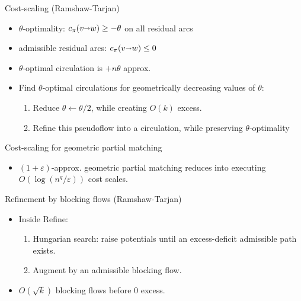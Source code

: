 \documentclass[xcolor={dvipsnames,usenames}]{beamer}
\newcommand{\eps}{\varepsilon}
\def\arcto{\mathord\shortrightarrow}
\def\arc#1#2{#1\arcto#2}
\begin{document}
\begin{frame}{Cost-scaling (Ramshaw-Tarjan)}
\begin{itemize}
\item \alert{$\theta$-optimality}: $c_\pi(\arc vw) \geq -\theta$ on all residual arcs
\item \alert{admissible} residual arcs: $c_\pi(\arc vw) \leq 0$ 
\vspace{15pt}
\item $\theta$-optimal circulation is $+n\theta$ approx.
\vspace{15pt}
\item Find $\theta$-optimal circulations for geometrically decreasing values of $\theta$:
	\begin{enumerate}
	\item Reduce $\theta \gets \theta/2$, while creating $O(k)$ excess.
	\item \alert{Refine} this pseudoflow into a circulation, while preserving $\theta$-optimality
	\end{enumerate}
\end{itemize}
\end{frame}

\begin{frame}{Cost-scaling for geometric partial matching}
\begin{itemize}
\item $(1+\eps)$-approx. geometric partial matching reduces into executing $O(\log(n^q/\eps))$ cost scales.
\end{itemize}
\end{frame}

\begin{frame}{Refinement by blocking flows (Ramshaw-Tarjan)}
\begin{itemize}
\item Inside Refine:
	\begin{enumerate}
	\item Hungarian search: raise potentials until an excess-deficit admissible path exists.
	\item Augment by an admissible \alert{blocking flow}.
	\end{enumerate}
\item $O(\sqrt{k})$ blocking flows before 0 excess.
\end{itemize}
\end{frame}
\end{document}
